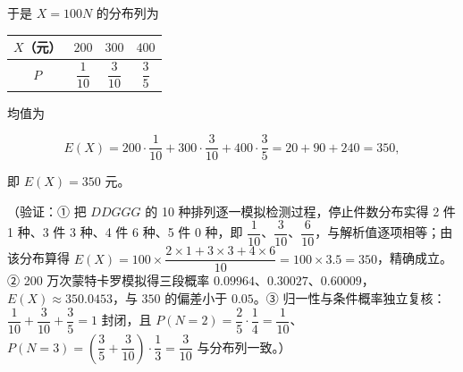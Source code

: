 \begin{answer}
于是 \(X=100N\) 的分布列为

\begin{center}
\begin{tabular}{cccc}
\toprule
\(X\)（元） & \(200\) & \(300\) & \(400\) \\
\midrule
\(P\) & \(\dfrac{1}{10}\) & \(\dfrac{3}{10}\) & \(\dfrac{3}{5}\) \\
\bottomrule
\end{tabular}
\end{center}

均值为

\nopagebreak[4]
\[
E(X)=200\cdot\dfrac{1}{10}+300\cdot\dfrac{3}{10}+400\cdot\dfrac{3}{5}=20+90+240=350,
\]

即 \(E(X)=350\) 元。

（验证：① 把 \(DDGGG\) 的 10 种排列逐一模拟检测过程，停止件数分布实得 2 件 1 种、3 件 3 种、4 件 6 种、5 件 0 种，即 \(\dfrac{1}{10}\)、\(\dfrac{3}{10}\)、\(\dfrac{6}{10}\)，与解析值逐项相等；由该分布算得 \(E(X)=100\times\dfrac{2\times 1+3\times 3+4\times 6}{10}=100\times 3.5=350\)，精确成立。② 200 万次蒙特卡罗模拟得三段概率 \(0.09964\)、\(0.30027\)、\(0.60009\)，\(E(X)\approx 350.0453\)，与 \(350\) 的偏差小于 \(0.05\)。③ 归一性与条件概率独立复核：\(\dfrac{1}{10}+\dfrac{3}{10}+\dfrac{3}{5}=1\) 封闭，且 \(P(N=2)=\dfrac{2}{5}\cdot\dfrac{1}{4}=\dfrac{1}{10}\)、\(P(N=3)=\left(\dfrac{3}{5}+\dfrac{3}{10}\right)\cdot\dfrac{1}{3}=\dfrac{3}{10}\) 与分布列一致。）



\end{answer}
